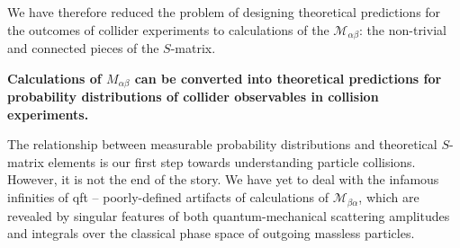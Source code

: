 

\begin{answer}
    We have therefore reduced the problem of designing theoretical predictions for the outcomes of collider experiments to calculations of the \(\mathcal{M}_{\alpha\beta}\):
    the non-trivial and connected pieces of the \(S\)-matrix.

    \textbf{Calculations of \(M_{\alpha\beta}\) can be converted into theoretical predictions for probability distributions of collider observables in collision experiments.}
\end{answer}


\begin{example}
    \label{ex:gtogg-squared}

\end{example}

\begin{example}
    \label{ex:qtoqg-squared}

\end{example}

\begin{exercise}
    \label{ex:gtoqq-squared}

\end{exercise}

The relationship between measurable probability distributions and theoretical \(S\)-matrix elements is our first step towards understanding particle collisions.
%
However, it is not the end of the story.
%
We have yet to deal with the infamous infinities of \gls{qft} -- poorly-defined artifacts of calculations of \(\mathcal{M}_{\beta\alpha}\), which are revealed by singular features of both quantum-mechanical scattering amplitudes and integrals over the classical phase space of outgoing massless particles.

